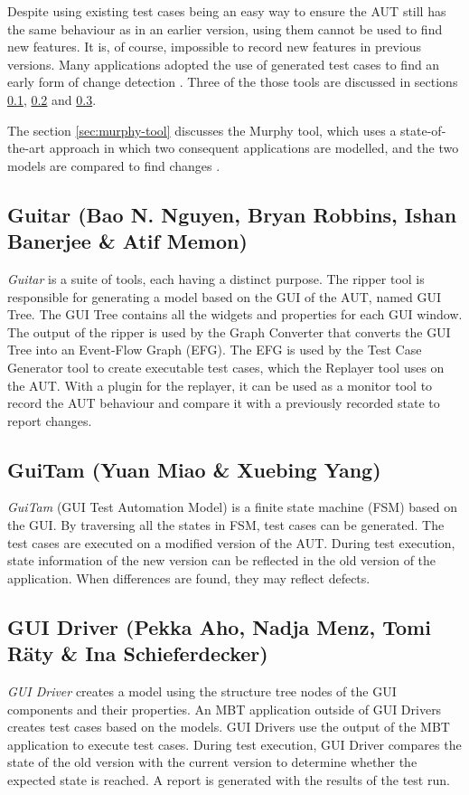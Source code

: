 Despite using existing test cases being an easy way to ensure the AUT still has the same behaviour as in an earlier version, using them cannot be used to find new features. It is, of course, impossible to record new features in previous versions. Many applications adopted the use of generated test cases to find an early form of change detection \cite{aho2019automated}. Three of the those tools are discussed in sections \ref{sec:guitar}, \ref{sec:guitam} and \ref{sec:gui-driver}.

The section \ref{sec:murphy-tool} discusses the Murphy tool, which uses a state-of-the-art approach in which two consequent applications are modelled, and the two models are compared to find changes \cite{aho2019automated}.

\subsection{Guitar (Bao N. Nguyen, Bryan Robbins, Ishan Banerjee \& Atif Memon)} \label{sec:guitar}

\emph{Guitar} \cite{nguyen2014guitar} is a suite of tools, each having a distinct purpose. The ripper tool is responsible for generating a model based on the GUI of the AUT, named GUI Tree. The GUI Tree contains all the widgets and properties for each GUI window. The output of the ripper is used by the Graph Converter that converts the GUI Tree into an Event-Flow Graph (EFG). The EFG is used by the Test Case Generator tool to create executable test cases, which the Replayer tool uses on the AUT. With a plugin for the replayer, it can be used as a monitor tool to record the AUT behaviour and compare it with a previously recorded state to report changes.

\subsection{GuiTam (Yuan Miao \& Xuebing Yang)} \label{sec:guitam}
\emph{GuiTam} \cite{miao2010fsm} (GUI Test Automation Model) is a finite state machine (FSM) based on the GUI. By traversing all the states in FSM, test cases can be generated. The test cases are executed on a modified version of the AUT. During test execution, state information of the new version can be reflected in the old version of the application. When differences are found, they may reflect defects. 

\subsection{GUI Driver (Pekka Aho, Nadja Menz, Tomi Räty \& Ina Schieferdecker)}  \label{sec:gui-driver}
\emph{GUI Driver} \cite{aho2011automated} creates a model using the structure tree nodes of the GUI components and their properties. An MBT application \cite{mbt-tigris-org} outside of GUI Drivers creates test cases based on the models. GUI Drivers use the output of the MBT application to execute test cases. During test execution, GUI Driver compares the state of the old version with the current version to determine whether the expected state is reached. A report is generated with the results of the test run. 

